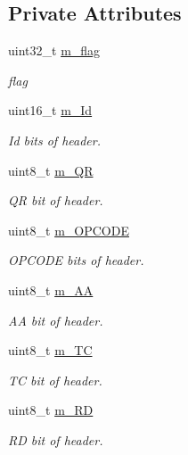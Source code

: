 \subsection*{Private Attributes}
\begin{DoxyCompactItemize}
\item 
uint32\-\_\-t \hyperlink{classns3_1_1DnsPlusHeader_a2cb95f6912613452fc57847e15e4f7ac}{m\-\_\-flag}
\begin{DoxyCompactList}\small\item\em flag \end{DoxyCompactList}\item 
uint16\-\_\-t \hyperlink{classns3_1_1DnsPlusHeader_a5c9375cfe16fc339e52d0ae1b9c19a24}{m\-\_\-\-Id}
\begin{DoxyCompactList}\small\item\em Id bits of header. \end{DoxyCompactList}\item 
uint8\-\_\-t \hyperlink{classns3_1_1DnsPlusHeader_a913492faf18c9740d1a4db2e7b056b54}{m\-\_\-\-Q\-R}
\begin{DoxyCompactList}\small\item\em Q\-R bit of header. \end{DoxyCompactList}\item 
uint8\-\_\-t \hyperlink{classns3_1_1DnsPlusHeader_ae93aeff5c9677e5252405cab8323f2df}{m\-\_\-\-O\-P\-C\-O\-D\-E}
\begin{DoxyCompactList}\small\item\em O\-P\-C\-O\-D\-E bits of header. \end{DoxyCompactList}\item 
uint8\-\_\-t \hyperlink{classns3_1_1DnsPlusHeader_a2e41f079b9f89209837405def7797a0d}{m\-\_\-\-A\-A}
\begin{DoxyCompactList}\small\item\em A\-A bit of header. \end{DoxyCompactList}\item 
uint8\-\_\-t \hyperlink{classns3_1_1DnsPlusHeader_ad6b32f1358164571eb3eba7f083af321}{m\-\_\-\-T\-C}
\begin{DoxyCompactList}\small\item\em T\-C bit of header. \end{DoxyCompactList}\item 
uint8\-\_\-t \hyperlink{classns3_1_1DnsPlusHeader_aceb20feea34744185f0e8fcb0ea4e7f4}{m\-\_\-\-R\-D}
\begin{DoxyCompactList}\small\item\em R\-D bit of header. \end{DoxyCompactList}\item 

\end{DoxyCompactItemize}
